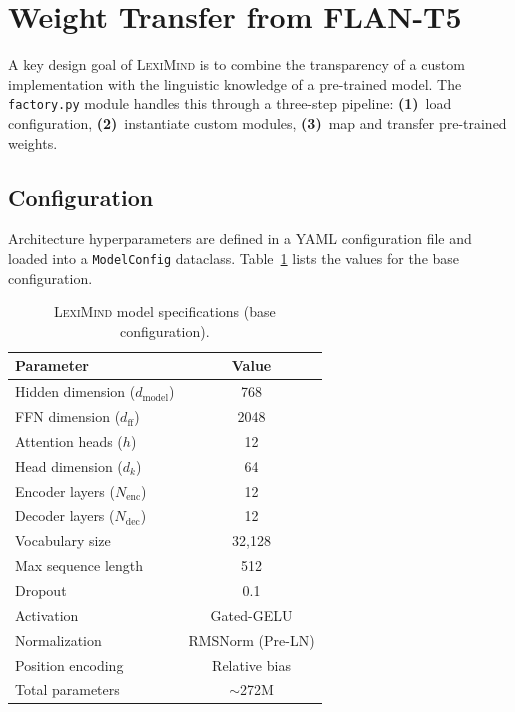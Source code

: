 \documentclass[11pt,a4paper]{article}
\newcommand{\lexiname}{\textsc{LexiMind}}
\begin{document}
\section{Weight Transfer from FLAN-T5}
\label{sec:weight_transfer}

A key design goal of \lexiname{} is to combine the transparency of a custom implementation with the linguistic knowledge of a pre-trained model.
The \texttt{factory.py} module handles this through a three-step pipeline: \textbf{(1)}~load configuration, \textbf{(2)}~instantiate custom modules, \textbf{(3)}~map and transfer pre-trained weights.

\subsection{Configuration}

Architecture hyperparameters are defined in a YAML configuration file and loaded into a \texttt{ModelConfig} dataclass.
Table~\ref{tab:model_specs} lists the values for the base configuration.

\begin{table}[t]
\centering
\caption{\lexiname{} model specifications (base configuration).}
\label{tab:model_specs}
\begin{tabular}{lc}
\toprule
\textbf{Parameter} & \textbf{Value} \\
\midrule
Hidden dimension ($d_\text{model}$) & 768 \\
FFN dimension ($d_\text{ff}$) & 2048 \\
Attention heads ($h$) & 12 \\
Head dimension ($d_k$) & 64 \\
Encoder layers ($N_\text{enc}$) & 12 \\
Decoder layers ($N_\text{dec}$) & 12 \\
Vocabulary size & 32{,}128 \\
Max sequence length & 512 \\
Dropout & 0.1 \\
Activation & Gated-GELU \\
Normalization & RMSNorm (Pre-LN) \\
Position encoding & Relative bias \\
\midrule
Total parameters & $\sim$272M \\
\bottomrule
\end{tabular}
\end{table}
\end{document}
